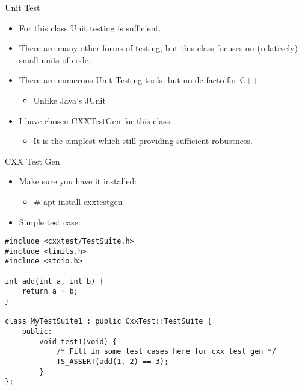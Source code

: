 \documentclass{beamer}
\begin{document}
\begin{frame}{Unit Test}
\begin{itemize}
\item For this class Unit testing is sufficient.
\item There are many other forms of testing, but this class focuses on (relatively) small units of code.
\item There are numerous Unit Testing tools, but no de facto for C++
\begin{itemize}
\item Unlike Java's JUnit
\end{itemize}
\item I have chosen CXXTestGen for this class.
\begin{itemize}
\item It is the simplest which still providing sufficient robustness.
\end{itemize}
\end{itemize}
\end{frame}

\begin{frame}[fragile]{CXX Test Gen}
\begin{itemize}
\item Make sure you have it installed:
\begin{itemize}
\item \# apt install cxxtestgen
\end{itemize}
\item Simple test case:
\end{itemize}
\begin{lstlisting}
#include <cxxtest/TestSuite.h>
#include <limits.h>
#include <stdio.h>

int add(int a, int b) {
    return a + b;
}

class MyTestSuite1 : public CxxTest::TestSuite {
    public:
        void test1(void) {
            /* Fill in some test cases here for cxx test gen */
            TS_ASSERT(add(1, 2) == 3);
        }
};

\end{lstlisting}
\end{frame}
\end{document}
